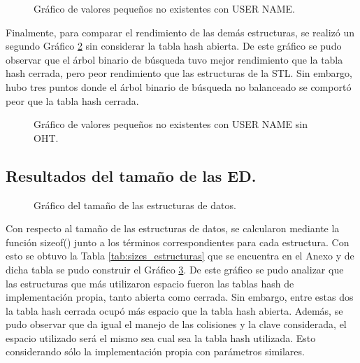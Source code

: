 \begin{multicols}{2}
\begin{figure}[H]
    \centering
    
    \caption{Gráfico de valores pequeños no existentes con USER NAME.}
    \label{fig:valores_pequeños_no_existentes_con_user_name}
\end{figure}
Finalmente, para comparar el rendimiento de las demás estructuras, se realizó un segundo Gráfico \ref{fig:valores_pequeños_no_existentes_con_user_name_sin_OHT} sin considerar la tabla hash abierta. De este gráfico se pudo observar que el árbol binario de búsqueda tuvo mejor rendimiento que la tabla hash cerrada, pero peor rendimiento que las estructuras de la STL. Sin embargo, hubo tres puntos donde el árbol binario de búsqueda no balanceado se comportó peor que la tabla hash cerrada.

\begin{figure}[H]
    \centering
    
    \caption{Gráfico de valores pequeños no existentes con USER NAME sin OHT.}
    \label{fig:valores_pequeños_no_existentes_con_user_name_sin_OHT}
\end{figure}

\subsection{Resultados del tamaño de las ED.}
\begin{figure}[H]
    \centering
    
    \caption{Gráfico del tamaño de las estructuras de datos.}
    \label{fig:sizes_estructuras}
\end{figure}
Con respecto al tamaño de las estructuras de datos, se calcularon mediante la función sizeof() junto a los términos correspondientes para cada estructura. Con esto se obtuvo la Tabla \ref{tab:sizes_estructuras} que se encuentra en el Anexo y de dicha tabla se pudo construir el Gráfico \ref{fig:sizes_estructuras}. De este gráfico se pudo analizar que las estructuras que más utilizaron espacio fueron las tablas hash de implementación propia, tanto abierta como cerrada. Sin embargo, entre estas dos la tabla hash cerrada ocupó más espacio que la tabla hash abierta. Además, se pudo observar que da igual el manejo de las colisiones y la clave considerada, el espacio utilizado será el mismo sea cual sea la tabla hash utilizada. Esto considerando sólo la implementación propia con parámetros similares.\\


\end{multicols}

